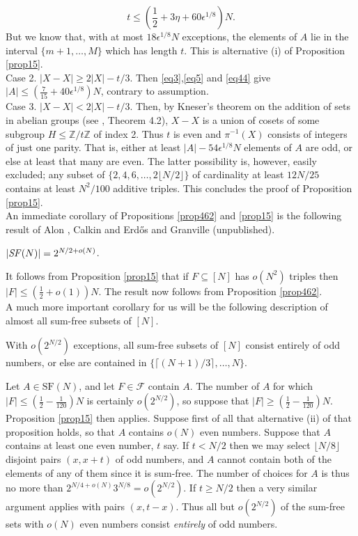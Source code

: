 \documentclass[a4paper,12pt]{article}
\begin{document}
\begin{equation}\label{eq4} t \leq \left(\textstyle\frac{1}{2}\displaystyle + 3\eta + 60\epsilon^{1/8}\right)N.\end{equation} 
But we know that, with at most $18\epsilon^{1/8}N$ exceptions, the elements of $A$ lie in the interval $\{m+1,\dots,M\}$ which has length $t$. 
This is alternative (i) of Proposition \ref{prop15}. \\[11pt]
Case 2. $|X - X| \geq 2|X| - t/3$. Then \eqref{eq3},\eqref{eq5} and \eqref{eq44} give $|A| \leq (\frac{7}{15} + 40\epsilon^{1/8})N$, contrary to assumption.\\[11pt]
Case 3. $|X - X| < 2|X| - t/3$. Then, by Kneser's theorem on the addition of sets in abelian groups (see \cite{Nath}, Theorem 4.2), $X - X$ is a union of cosets of some subgroup $H \leq \mathbb{Z}/t\mathbb{Z}$ of index 2. Thus $t$ is even and $\pi^{-1}(X)$ consists of integers of just one parity. That is, either at least $|A| - 54\epsilon^{1/8}N$ elements of $A$ are odd, or else at least that many are even. The latter possibility is, however, easily excluded; any subset of $\{2,4,6,\dots,2\lfloor N/2\rfloor\}$ of cardinality at least $12N/25$ contains at least $N^2/100$ additive triples. This concludes the proof of Proposition \ref{prop15}.\\[11pt]
An immediate corollary of Propositions \ref{prop462} and \ref{prop15} is the following result of Alon \cite{Alon}, Calkin \cite{Calk} and Erd\H{o}s and Granville (unpublished).
\begin{propositionenv} \label{AC} $|\mbox{\emph{SF}}(N)| = 2^{N/2 + o(N)}$.
\end{propositionenv}
\proof It follows from Proposition \ref{prop15} that if $F \subseteq [N]$ has $o(N^2)$ triples then $|F| \leq (\frac{1}{2} + o(1))N$. The result now follows from Proposition \ref{prop462}.\endproof\\[11pt]
A much more important corollary for us will be the following description of almost all sum-free subsets of $[N]$.
\begin{corollaryenv}\label{cor4} With $o(2^{N/2})$ exceptions, all sum-free subsets of $[N]$ consist entirely of odd numbers, or else are contained in $\{\lceil (N+1)/3\rceil,\dots,N\}$.
\end{corollaryenv}
\proof Let $A \in \mbox{SF}(N)$, and let $F \in \mathcal{F}$ contain $A$. The number of $A$ for which $|F| \leq \left(\frac{1}{2} - \frac{1}{120}\right)N$ is certainly $o(2^{N/2})$, so suppose that $|F| \geq \left(\frac{1}{2} - \frac{1}{120}\right)N$. Proposition \ref{prop15} then applies. Suppose first of all that alternative (ii) of that proposition holds, so that $A$ contains $o(N)$ even numbers. Suppose that $A$ contains at least one even number, $t$ say. If $t < N/2$ then we may select $\lfloor N/8\rfloor$ disjoint pairs $(x,x+t)$ of odd numbers, and $A$ cannot contain both of the elements of any of them since it is sum-free. The number of choices for $A$ is thus no more than $2^{N/4 + o(N)}3^{N/8} = o(2^{N/2})$. If $t \geq N/2$ then a very similar argument applies with pairs $(x,t - x)$. Thus all but $o(2^{N/2})$ of the sum-free sets with $o(N)$ even numbers consist \textit{entirely} of odd numbers.
\end{document}
